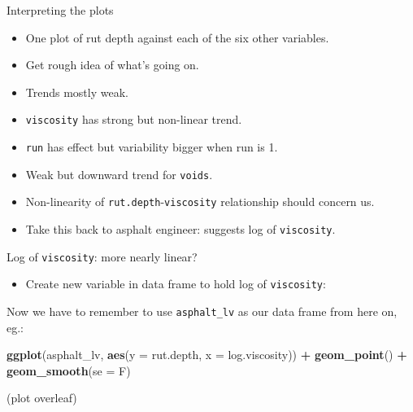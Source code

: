 \documentclass[
  ignorenonframetext,
]{beamer}
\newenvironment{Shaded}{\begin{snugshade}}{\end{snugshade}}
\newcommand{\DataTypeTok}[1]{\textcolor[rgb]{0.13,0.29,0.53}{#1}}
\newcommand{\KeywordTok}[1]{\textcolor[rgb]{0.13,0.29,0.53}{\textbf{#1}}}
\newcommand{\NormalTok}[1]{#1}
\newcommand{\OperatorTok}[1]{\textcolor[rgb]{0.81,0.36,0.00}{\textbf{#1}}}
\newcommand{\StringTok}[1]{\textcolor[rgb]{0.31,0.60,0.02}{#1}}
\providecommand{\tightlist}{%
  \setlength{\itemsep}{0pt}\setlength{\parskip}{0pt}}
\begin{document}
\begin{frame}[fragile]{Interpreting the plots}
\protect\hypertarget{interpreting-the-plots}{}

\begin{itemize}
\tightlist
\item
  One plot of rut depth against each of the six other variables.
\item
  Get rough idea of what's going on.
\item
  Trends mostly weak.
\item
  \texttt{viscosity} has strong but non-linear trend.
\item
  \texttt{run} has effect but variability bigger when run is 1.
\item
  Weak but downward trend for \texttt{voids}.
\item
  Non-linearity of \texttt{rut.depth}-\texttt{viscosity} relationship
  should concern us.
\item
  Take this back to asphalt engineer: suggests log of
  \texttt{viscosity}.
\end{itemize}

\end{frame}

\begin{frame}[fragile]{Log of \texttt{viscosity}: more nearly linear?}
\protect\hypertarget{log-of-viscosity-more-nearly-linear}{}

\begin{itemize}
\tightlist
\item
  Create new variable in data frame to hold log of \texttt{viscosity}:
\end{itemize}

\begin{Shaded}
\end{Shaded}

Now we have to remember to use \texttt{asphalt\_lv} as our data frame
from here on, eg.:

\begin{Shaded}
\begin{Highlighting}[]
\KeywordTok{ggplot}\NormalTok{(asphalt_lv, }\KeywordTok{aes}\NormalTok{(}\DataTypeTok{y =}\NormalTok{ rut.depth, }\DataTypeTok{x =}\NormalTok{ log.viscosity)) }\OperatorTok{+}
\StringTok{  }\KeywordTok{geom_point}\NormalTok{() }\OperatorTok{+}\StringTok{ }\KeywordTok{geom_smooth}\NormalTok{(}\DataTypeTok{se =}\NormalTok{ F)}
\end{Highlighting}
\end{Shaded}

(plot overleaf)

\end{frame}
\end{document}
